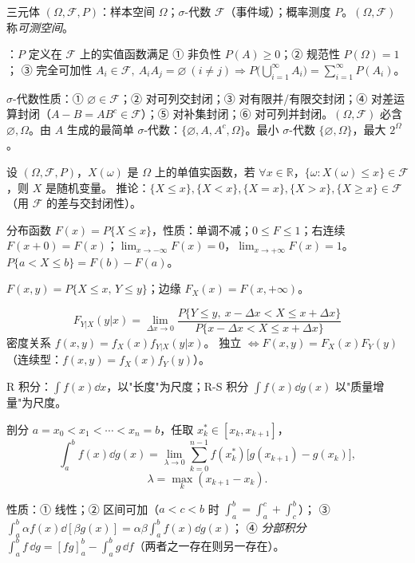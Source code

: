 \documentclass[UTF8,12pt,a4paper]{ctexart}
\begin{document}

三元体 $(\Omega,\mathcal F,P)$：样本空间 $\Omega$；$\sigma$-代数 $\mathcal F$（事件域）；概率测度 $P$。$(\Omega,\mathcal F)$ 称\emph{可测空间}。

：$P$ 定义在 $\mathcal F$ 上的实值函数满足
① 非负性 $P(A)\ge 0$；② 规范性 $P(\Omega)=1$；
③ 完全可加性 $A_i\in\mathcal F,\ A_iA_j=\varnothing\ (i\ne j)\Rightarrow P\big(\bigcup_{i=1}^\infty A_i\big)=\sum_{i=1}^\infty P(A_i)$。

$\sigma$-代数性质：① $\varnothing\in\mathcal F$；② 对可列交封闭；③ 对有限并/有限交封闭；④ 对差运算封闭（$A-B=AB^c\in\mathcal F$）；⑤ 对补集封闭；⑥ 对可列并封闭。$(\Omega,\mathcal F)$ 必含 $\varnothing,\Omega$。由 $A$ 生成的最简单 $\sigma$-代数：$\{\varnothing,A,A^c,\Omega\}$。最小 $\sigma$-代数 $\{\varnothing,\Omega\}$，最大 $2^\Omega$。

 设 $(\Omega,\mathcal F,P)$，$X(\omega)$ 是 $\Omega$ 上的单值实函数，若 $\forall x\in\mathbb R$，$\{\omega:X(\omega)\le x\}\in\mathcal F$，则 $X$ 是随机变量。
推论：$\{X\le x\},\{X<x\},\{X=x\},\{X>x\},\{X\ge x\}\in\mathcal F$（用 $\mathcal F$ 的差与交封闭性）。

分布函数 $F(x)=P\{X\le x\}$，性质：单调不减；$0\le F\le 1$；右连续 $F(x+0)=F(x)$；$\lim_{x\to-\infty}F(x)=0$，$\lim_{x\to+\infty}F(x)=1$。
$P\{a<X\le b\}=F(b)-F(a)$。

 $F(x,y)=P\{X\le x,\,Y\le y\}$；边缘 $F_X(x)=F(x,+\infty)$。

$$F_{Y|X}(y|x)=\lim_{\Delta x\to0}\frac{P\{Y\le y,\ x-\Delta x<X\le x+\Delta x\}}{P\{x-\Delta x<X\le x+\Delta x\}}$$
密度关系 $f(x,y)=f_X(x)f_{Y|X}(y|x)$。
独立 $\iff F(x,y)=F_X(x)F_Y(y)$（连续型：$f(x,y)=f_X(x)f_Y(y)$）。

R 积分：$\int f(x)\dd x$，以"长度"为尺度；R-S 积分 $\int f(x)\dd g(x)$ 以"质量增量"为尺度。

 剖分 $a=x_0<x_1<\cdots<x_n=b$，任取 $x_k^*\in[x_k,x_{k+1}]$，
$$\int_a^b f(x)\dd g(x)=\lim_{\lambda\to0}\sum_{k=0}^{n-1}f(x_k^*)\big[g(x_{k+1})-g(x_k)\big],$$
$$\lambda=\max_k(x_{k+1}-x_k).$$

性质：① 线性；② 区间可加（$a<c<b$ 时 $\int_a^b=\int_a^c+\int_c^b$）；
③ $\displaystyle\int_a^b\alpha f(x)\dd[\beta g(x)]=\alpha\beta\int_a^b f(x)\dd g(x)$；
④ \emph{分部积分} $\displaystyle\int_a^b f\,\dd g=[fg]_a^b-\int_a^b g\,\dd f$（两者之一存在则另一存在）。
\end{document}

